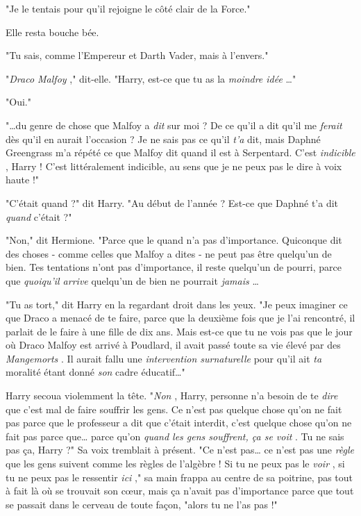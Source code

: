 "Je le tentais pour qu'il rejoigne le côté clair de la Force."

Elle resta bouche bée.

"Tu sais, comme l'Empereur et Darth Vader, mais à l'envers."

"\emph{Draco Malfoy} ," dit-elle. "Harry, est-ce que tu as la \emph{moindre idée} …"

"Oui."

"…du genre de chose que Malfoy a \emph{dit}  sur moi ? De ce qu'il a dit qu'il me \emph{ferait}  dès qu'il en aurait l'occasion ? Je ne sais pas ce qu'il \emph{t'a}  dit, mais Daphné Greengrass m'a répété ce que Malfoy dit quand il est à Serpentard. C'est \emph{indicible} , Harry ! C'est littéralement indicible, au sens que je ne peux pas le dire à voix haute !"

"C'était quand ?" dit Harry. "Au début de l'année ? Est-ce que Daphné t'a dit \emph{quand}  c'était ?"

"Non," dit Hermione. "Parce que le quand n'a pas d'importance. Quiconque dit des choses - comme celles que Malfoy a dites - ne peut pas être quelqu'un de bien. Tes tentations n'ont pas d'importance, il reste quelqu'un de pourri, parce que \emph{quoiqu'il arrive}  quelqu'un de bien ne pourrait \emph{jamais} …

"Tu as tort," dit Harry en la regardant droit dans les yeux. "Je peux imaginer ce que Draco a menacé de te faire, parce que la deuxième fois que je l'ai rencontré, il parlait de le faire à une fille de dix ans. Mais est-ce que tu ne vois pas que le jour où Draco Malfoy est arrivé à Poudlard, il avait passé toute sa vie élevé par des \emph{Mangemorts} . Il aurait fallu une \emph{intervention surnaturelle}  pour qu'il ait \emph{ta}  moralité étant donné \emph{son}  cadre éducatif…"

Harry secoua violemment la tête. "\emph{Non} , Harry, personne n'a besoin de te \emph{dire}  que c'est mal de faire souffrir les gens. Ce n'est pas quelque chose qu'on ne fait pas parce que le professeur a dit que c'était interdit, c'est quelque chose qu'on ne fait pas parce que… parce qu'on \emph{quand les gens souffrent, ça se voit} . Tu ne sais pas ça, Harry ?" Sa voix tremblait à présent. "Ce n'est pas… ce n'est pas une \emph{règle}  que les gens suivent comme les règles de l'algèbre ! Si tu ne peux pas le \emph{voir} , si tu ne peux pas le ressentir \emph{ici} ," sa main frappa au centre de sa poitrine, pas tout à fait là où se trouvait son cœur, mais ça n'avait pas d'importance parce que tout se passait dans le cerveau de toute façon, "alors tu ne l'as pas !"

